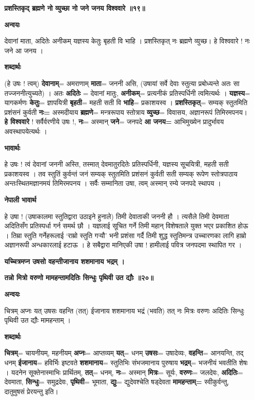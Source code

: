 \documentclass[11pt, a5paper]{article}
\begin{document}
\textbf{प्रशस्तिकृद् ब्रह्मणे नो व्युच्छा नो जने जनय विश्ववारे ॥१९॥}

\textbf{अन्वयः}

देवानां माता, अदितेः अनीकम् यज्ञस्य केतुः बृहती वि भाहि । प्रशस्तिकृत् नः ब्रह्मणे व्युच्छ। हे विश्ववारे !  नः जने आ जनय ।

\textbf{शब्दार्थः}

(हे उषः ! त्वम्) \textbf{देवानाम्}= अमराणाम् \textbf{माता}= जननी असि, (उषायां सर्वे देवाः स्तुत्या प्रबोध्यन्ते अतः सा तज्जननीत्युच्यते) । अतः \textbf{अदितेः} = देवानां मातुः, \textbf{अनीकम्}= प्रत्यनीकं प्रतिस्पर्धिनी त्वमित्यर्थः । \textbf{यज्ञस्य}= यागकर्मणः \textbf{केतुः}= ज्ञापयित्री \textbf{बृहती}= महती सती वि \textbf{भाहि}= प्रकाशयस्व । \textbf{प्रशस्तिकृत्}= सम्यक् स्तुतमिति प्रशंसनं कुर्वती \textbf{नः=} अस्मदीयाय \textbf{ब्रह्मणे}= मन्त्ररूपाय स्तोत्राय \textbf{व्युच्छ}= विवासय, अज्ञानरूपं तिमिरमपनय। \textbf{हे विश्ववारे} ! सर्वैर्वरणीये उषः !, \textbf{नः}= अस्मान् \textbf{जने}= जनपदे \textbf{आ जनय=} आभिमुख्येन प्रादुर्भावय अवस्थापयेत्यर्थः ।

\textbf{भावार्थः}

हे उषः ! त्वं देवानां जननी अस्ति, तस्मात् देवमातुरदितेः प्रतिस्पर्धिनी, यज्ञस्य सूचयित्री, महती सती प्रकाशयस्व । तव स्तुतिं कुर्वन्तं जनं सम्यक् स्तुतमिति प्रशंसनं कुर्वती सती सम्यक् रूपेण स्तोत्रपाठाय अन्तःस्थितमज्ञानमयं तिमिरमपनय । सर्वैः सम्मानिता उषा, त्वम् अस्मान् रम्ये जनपदे स्थापय ।

\textbf{नेपाली भावार्थ}

हे उषा ! (उषाकालमा स्तुतिद्वारा उठाइने हुनाले) तिमी देवाताकी जननी हौ । त्यसैले तिमी देवमाता अदितिसँग प्रतिस्पर्धा गर्न समर्थ छौ । यज्ञलाई सूचित गर्ने तिमी महान् विशेषताले युक्त भएर प्रकाशित होऊ । तिम्रा स्तुति गर्नेहरूलाई ‘राम्रो स्तुति गर्‍यौ’ भनी प्रशंसा गर्दै तिमी शुद्ध स्तुतिमन्त्र उच्चारणका लागि हाम्रो अज्ञानरूपी अन्धकारलाई हटाऊ । हे सबैद्वारा मानिएकी उषा !  हामीलाई पवित्र जनपदमा स्थापित गर ।

\textbf{यच्चित्रमप्न उषसो वहन्तीजानाय शशमानाय भद्रम् ।}

\textbf{तन्नो मित्रो वरुणो मामहन्तामदितिः सिन्धुः पृथिवी उत द्यौः ॥२०॥}

\textbf{अन्वयः}

चित्रम् अप्नः यत् उषसः वहन्ति (तत्) ईजानाय शशमानाय भद्रं (भवति) तत् नः मित्रः वरुणः अदितिः सिन्धुः पृथिवी उत द्यौः मामहन्ताम् ।

\textbf{शब्दार्थः}

\textbf{चित्रम्}= चायनीयम्, महनीयम् \textbf{अप्नः}= आप्तव्यम् \textbf{यत्}= धनम् \textbf{उषसः}= उषादेव्यः, \textbf{वहन्ति}= आनयन्ति, तद् धनम्  \textbf{ईजानाय}= हविर्भिः इष्टवते \textbf{शशमानाय}= स्तुतिभिः संभजमानाय पुरुषाय \textbf{भद्रम्}= भजनीयं भवतीति शेषः । यदनेन सूक्तेनास्माभिः प्रार्थितम्, \textbf{तत्}= धनम्, \textbf{नः}= अस्मान्  \textbf{मित्रः}= सूर्यः, \textbf{वरुणः}= जलदेवः, \textbf{अदितिः}= देवमाता, \textbf{सिन्धुः}= समुद्रदेवः, \textbf{पृथिवी}= भूमाता, \textbf{द्युः}= द्युदेवश्चेति षड्‌देवता \textbf{मामहन्ताम्=}  स्वीकुर्वन्तु, दातुमुषसं प्रेरयन्तु इति।
\end{document}
